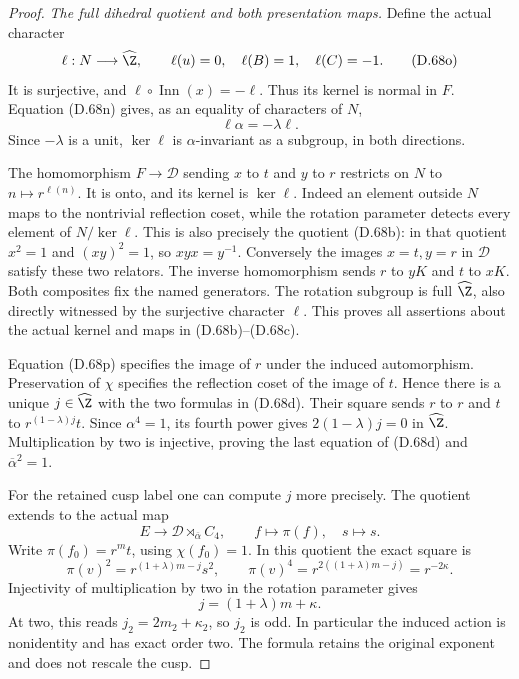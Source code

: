 \begin{proof}
\emph{The full dihedral quotient and both presentation maps.}
Define the actual character
\[
 \ell:N\longrightarrow\widehat\Z,\qquad
       \ell(u)=0,\quad\ell(B)=1,\quad\ell(C)=-1.
                                                               \tag{D.68o}
\]
It is surjective, and $\ell\circ\operatorname{Inn}(x)=-\ell$.
Thus its kernel is normal in $F$. Equation (D.68n)
gives, as an equality of characters of $N$,
\[
                         \ell\alpha=-\lambda\ell.         \tag{D.68p}
\]
Since $-\lambda$ is a unit, $\ker\ell$ is
$\alpha$-invariant as a subgroup, in both directions.

The homomorphism $F\to\mathcal D$ sending $x$ to $t$
and $y$ to $r$ restricts on $N$ to $n\mapsto r^{\ell(n)}$.
It is onto, and its kernel is $\ker\ell$. Indeed an
element outside $N$ maps to the nontrivial reflection
coset, while the rotation parameter detects every
element of $N/\ker\ell$.
This is also precisely the quotient (D.68b): in that
quotient $x^2=1$ and $(xy)^2=1$, so
$xyx=y^{-1}$. Conversely the images $x=t,y=r$ in
$\mathcal D$ satisfy these two relators.
The inverse homomorphism sends $r$ to $yK$ and $t$
to $xK$. Both composites fix the named generators.
The rotation subgroup is full $\widehat\Z$, also
directly witnessed by the surjective character $\ell$.
This proves all assertions about the actual kernel
and maps in (D.68b)--(D.68c).

Equation (D.68p) specifies the image of $r$ under the
induced automorphism. Preservation of $\chi$ specifies
the reflection coset of the image of $t$. Hence there
is a unique $j\in\widehat\Z$ with the two formulas
in (D.68d). Their square sends $r$ to $r$ and $t$ to
$r^{(1-\lambda)j}t$. Since $\alpha^4=1$, its fourth
power gives $2(1-\lambda)j=0$ in $\widehat\Z$.
Multiplication by two is injective, proving the last
equation of (D.68d) and $\overline\alpha^2=1$.

For the retained cusp label one can compute $j$ more
precisely. The quotient extends to the actual map
\[
 E\longrightarrow\mathcal D\rtimes_{\overline\alpha}C_4,
 \qquad f\longmapsto\pi(f),\quad s\longmapsto s.
                                                               \tag{D.68q}
\]
Write $\pi(f_0)=r^m t$, using $\chi(f_0)=1$.
In this quotient the exact square is
\[
 \pi(v)^2=r^{(1+\lambda)m-j}s^2,\qquad
 \pi(v)^4=r^{2((1+\lambda)m-j)}=r^{-2\kappa}.
\]
Injectivity of multiplication by two in the rotation
parameter gives
\[
                         j=(1+\lambda)m+\kappa.            \tag{D.68r}
\]
At two, this reads $j_2=2m_2+\kappa_2$, so $j_2$ is
odd. In particular the induced action is nonidentity
and has exact order two. The formula retains the
original exponent and does not rescale the cusp.


\end{proof}
